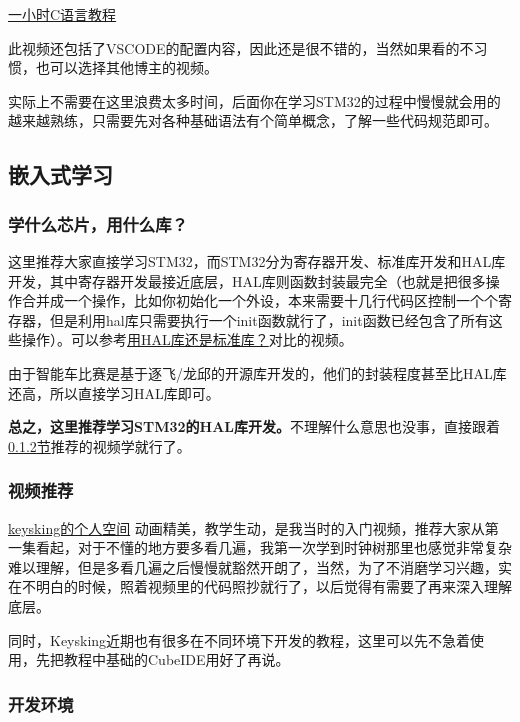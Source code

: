\documentclass[a4paper,12pt]{article}
\begin{document}
\href{https://www.bilibili.com/video/BV1Q142147VL/}{一小时C语言教程}

此视频还包括了VSCODE的配置内容，因此还是很不错的，当然如果看的不习惯，也可以选择其他博主的视频。

实际上不需要在这里浪费太多时间，后面你在学习STM32的过程中慢慢就会用的越来越熟练，只需要先对各种基础语法有个简单概念，了解一些代码规范即可。

\subsection{嵌入式学习}

\subsubsection{学什么芯片，用什么库？}

这里推荐大家直接学习STM32，而STM32分为寄存器开发、标准库开发和HAL库开发，其中寄存器开发最接近底层，HAL库则函数封装最完全（也就是把很多操作合并成一个操作，比如你初始化一个外设，本来需要十几行代码区控制一个个寄存器，但是利用hal库只需要执行一个init函数就行了，init函数已经包含了所有这些操作）。可以参考\href{https://www.bilibili.com/video/BV17dE7zCEbn/}{用HAL库还是标准库？}对比的视频。

由于智能车比赛是基于逐飞/龙邱的开源库开发的，他们的封装程度甚至比HAL库还高，所以直接学习HAL库即可。

\textbf{总之，这里推荐学习STM32的HAL库开发。}不理解什么意思也没事，直接跟着\hyperref[sec:video-tutorials]{\ref*{sec:video-tutorials}节}推荐的视频学就行了。

\subsubsection{视频推荐}
\label{sec:video-tutorials}

\href{https://space.bilibili.com/6100925}{keysking的个人空间} 动画精美，教学生动，是我当时的入门视频，推荐大家从第一集看起，对于不懂的地方要多看几遍，我第一次学到时钟树那里也感觉非常复杂难以理解，但是多看几遍之后慢慢就豁然开朗了，当然，为了不消磨学习兴趣，实在不明白的时候，照着视频里的代码照抄就行了，以后觉得有需要了再来深入理解底层。

同时，Keysking近期也有很多在不同环境下开发的教程，这里可以先不急着使用，先把教程中基础的CubeIDE用好了再说。

\subsubsection{开发环境}
\end{document}
